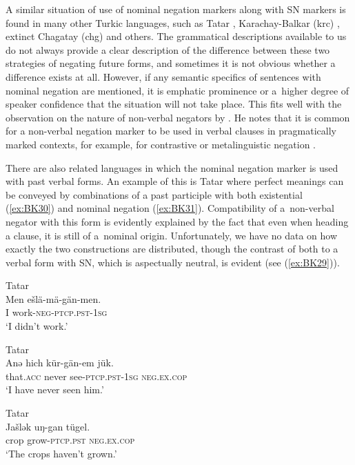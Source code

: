 \documentclass[output=paper,draft,draftmode,colorlinks,citecolor=brown]{langscibook}
\begin{document}
A similar situation of use of nominal negation markers along with SN markers is found in many other Turkic languages, such as Tatar \citep{poppe1961a}, Karachay-Balkar (krc) \citep{seegmiller1996a}, extinct Chagatay (chg) \citep{bodrogligeti2001a} and others. The grammatical descriptions available to us do not always provide a clear description of the difference between these two strategies of negating future forms, and sometimes it is not obvious whether a difference exists at all. However, if any semantic specifics of sentences with nominal negation are mentioned, it is emphatic prominence or a higher degree of speaker confidence that the situation will not take place. This fits well with the observation on the nature of non-verbal negators by \citet{Horn1989}. He notes that it is common for a non-verbal negation marker to be used in verbal clauses in pragmatically marked contexts, for example, for contrastive or metalinguistic negation \citep[446, 451–452]{Horn1989}.

There are also related languages in which the nominal negation marker is used with past verbal forms. An example of this is Tatar where perfect meanings can be conveyed by combinations of a past participle with both existential (\ref{ex:BK30}) and nominal negation (\ref{ex:BK31}). Compatibility of a non-verbal negator with this form is evidently explained by the fact that even when heading a clause, it is still of a nominal origin. Unfortunately, we have no data on how exactly the two constructions are distributed, though the contrast of both to a verbal form with SN, which is aspectually neutral, is evident (see (\ref{ex:BK29})).

\ea Tatar \citep[69]{poppe1961a} \label{ex:BK29}\\
	\gll Men	ešlä-mä-gän-men.\\
	I	work-\textsc{neg-ptcp.pst-1sg}\\
	\glt `I didn’t work.'
\z

\ea Tatar \citep[126]{poppe1961a} \label{ex:BK30}\\
	\gll Anǝ		hich		kür-gän-em			jük.\\
	that.\textsc{acc}	never		see-\textsc{ptcp.pst-1sg}	\textsc{neg.ex.cop}\\
	\glt `I have never seen him.'
\z

\ea Tatar \citep[126]{poppe1961a} \label{ex:BK31}\\
	\gll Jašlǝk		uŋ-gan			tügel.\\
	crop		grow-\textsc{ptcp.pst}	\textsc{neg.ex.cop}\\
	\glt `The crops haven’t grown.'
\z
\end{document}
